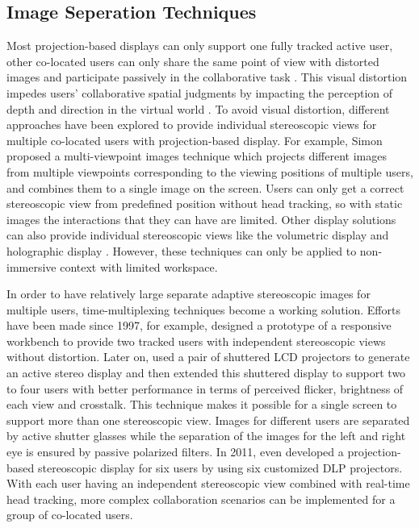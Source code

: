 \subsection{Image Seperation Techniques}
Most projection-based displays can only support one fully tracked active user, other co-located users can only share the same point of view with distorted images and participate passively in the collaborative task \citep{Bayon2006Multiple}. This visual distortion impedes users' collaborative spatial judgments by impacting the perception of depth and direction in the virtual world \citep{Pollock2012Right}. To avoid visual distortion, different approaches have been explored to provide individual stereoscopic views for multiple co-located users with projection-based display. For example, Simon proposed a multi-viewpoint images technique \citep{Simon2007MVI} which projects different images from multiple viewpoints corresponding to the viewing positions of multiple users, and combines them to a single image on the screen. Users can only get a correct stereoscopic view from predefined position without head tracking, so with static images the interactions that they can have are limited. Other display solutions can also provide individual stereoscopic views like the volumetric display \citep{Grossman2008Volum} and holographic display \citep{Lucente1997Holo}. However, these techniques can only be applied to non-immersive context with limited workspace.

In order to have relatively large separate adaptive stereoscopic images for multiple users, time-multiplexing techniques become a working solution. Efforts have been made since 1997, for example, \citet{Agrawala1997TRW} designed a prototype of a responsive workbench to provide two tracked users with independent stereoscopic views without distortion. Later on, \citet{Kunz2002TSC} used a pair of shuttered LCD projectors to generate an active stereo display and then \citet{Frohlich2005MultiViewer} extended this shuttered display to support two to four users with better performance in terms of perceived flicker, brightness of each view and crosstalk. This technique makes it possible for a single screen to support more than one stereoscopic view. Images for different users are separated by active shutter glasses while the separation of the images for the left and right eye is ensured by passive polarized filters. In 2011, \citet{Kulik2011CSS} even developed a projection-based stereoscopic display for six users by using six customized DLP projectors. With each user having an independent stereoscopic view combined with real-time head tracking, more complex collaboration scenarios can be implemented for a group of co-located users.

